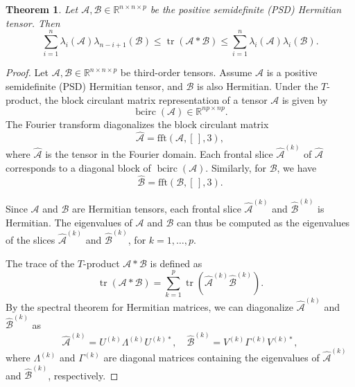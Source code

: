 \documentclass[oupthm]{CUP-JNL-BCM}%
\theoremstyle{oupplain}
\newtheorem{theorem}{Theorem}[section]
\theoremstyle{oupdefinition}
\theoremstyle{oupremark}
\theoremstyle{oupproof}
\newtheorem{proof}{Proof}
\numberwithin{equation}{section}
\begin{document}
\begin{theorem}
      Let $\mathcal{A}, \mathcal{B} \in \mathbb{R}^{n \times n \times p}$ be the positive semidefinite (PSD) Hermitian tensor. Then
     \begin{equation}
         \sum_{i=1}^n \lambda_i(\mathcal{A}) \lambda_{n-i+1}(\mathcal{B}) \leq \operatorname{tr}(\mathcal{A} *\mathcal{B}) \leq \sum_{i=1}^n \lambda_i(\mathcal{A}) \lambda_i(\mathcal{B}).
     \end{equation}
\end{theorem}

\begin{proof}
Let $\mathcal{A}, \mathcal{B} \in \mathbb{R}^{n \times n \times p}$ be third-order tensors. Assume $\mathcal{A}$ is a positive semidefinite (PSD) Hermitian tensor, and $\mathcal{B}$ is also Hermitian. Under the $T$-product, the block circulant matrix representation of a tensor $\mathcal{A}$ is given by
\[
\operatorname{bcirc}(\mathcal{A}) \in \mathbb{R}^{np \times np}.
\]
The Fourier transform diagonalizes the block circulant matrix
\[
\widehat{\mathcal{A}} = \text{fft}(\mathcal{A}, [\,], 3),
\]
where $\widehat{\mathcal{A}}$ is the tensor in the Fourier domain. Each frontal slice $\widehat{\mathcal{A}}^{(k)}$ of $\widehat{\mathcal{A}}$ corresponds to a diagonal block of $\operatorname{bcirc}(\mathcal{A})$. Similarly, for $\mathcal{B}$, we have
\[
\widehat{\mathcal{B}} = \text{fft}(\mathcal{B}, [\,], 3).
\]
  
\noindent Since $\mathcal{A}$ and $\mathcal{B}$ are Hermitian tensors, each frontal slice $\widehat{\mathcal{A}}^{(k)}$ and $\widehat{\mathcal{B}}^{(k)}$ is Hermitian. The eigenvalues of $\mathcal{A}$ and $\mathcal{B}$ can thus be computed as the eigenvalues of the slices $\widehat{\mathcal{A}}^{(k)}$ and $\widehat{\mathcal{B}}^{(k)}$, for $k = 1, \dots, p$.

 
\noindent The trace of the $T$-product $\mathcal{A} * \mathcal{B}$ is defined as
\[
\operatorname{tr}(\mathcal{A} * \mathcal{B}) = \sum_{k=1}^p \operatorname{tr}(\widehat{\mathcal{A}}^{(k)} \widehat{\mathcal{B}}^{(k)}).
\]
By the spectral theorem for Hermitian matrices, we can diagonalize $\widehat{\mathcal{A}}^{(k)}$ and $\widehat{\mathcal{B}}^{(k)}$ as
\[
\widehat{\mathcal{A}}^{(k)} = U^{(k)} \Lambda^{(k)} U^{(k)*}, \quad \widehat{\mathcal{B}}^{(k)} = V^{(k)} \Gamma^{(k)} V^{(k)*},
\]
where $\Lambda^{(k)}$ and $\Gamma^{(k)}$ are diagonal matrices containing the eigenvalues of $\widehat{\mathcal{A}}^{(k)}$ and $\widehat{\mathcal{B}}^{(k)}$, respectively.


\end{proof}
\end{document}
